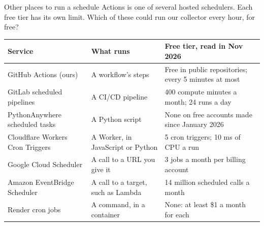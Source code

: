 \documentclass[9pt,aspectratio=169]{beamer}
\begin{document}
\begin{frame}{Other places to run a schedule}
    Actions is one of several hosted schedulers. Each free tier has its own limit. Which of these could run our collector every hour, for free?

    \medskip
    {\footnotesize\renewcommand{\arraystretch}{1.25}
    \begin{tabular}{@{}lll@{}}
        \toprule
        \textbf{Service} & \textbf{What runs} & \textbf{Free tier, read in Nov 2026} \\
        \midrule
        GitHub Actions (ours) & A workflow's steps & Free in public repositories; every 5 minutes at most \\
        GitLab scheduled pipelines & A CI/CD pipeline & 400 compute minutes a month; 24 runs a day \\
        PythonAnywhere scheduled tasks & A Python script & None on free accounts made since January 2026 \\
        Cloudflare Workers Cron Triggers & A Worker, in JavaScript or Python & 5 cron triggers; 10 ms of CPU a run \\
        Google Cloud Scheduler & A call to a URL you give it & 3 jobs a month per billing account \\
        Amazon EventBridge Scheduler & A call to a target, such as Lambda & 14 million scheduled calls a month \\
        Render cron jobs & A command, in a container & None: at least \$1 a month for each \\
        \bottomrule
    \end{tabular}\par}
\end{frame}
\end{document}
